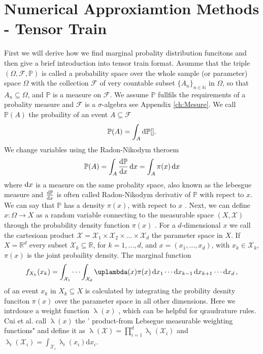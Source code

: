 \section{Numerical Approxiamtion Methods - Tensor Train}
\label{sec:tensortrain}
First we will derive how we find marginal probality distribution funcitons and then give a brief introduction into tensor train format.
Asumme that the triple $(\Omega, \mathcal{F} , \mathbb{P})$ is called a probability space over the whole sample (or parameter) space $\Omega$ with the collection $\mathcal{F}$ of very countable subset $\{ A _n \}_{n\in \mathbb{N}}$ in $\Omega$, so that $A_n \subseteq  \Omega$, and $\mathbb{P}$ is a measure on $\mathcal{F}$. 
We assume $\mathbb{P}$ fullfils the requirements of a probality measure and $\mathcal{F}$ is a $\sigma $-algebra see Appendix \ref{ch:Mesure}.
We call $\mathbb{P}(A)$ the probaility of an event $A \subseteq \mathcal{F}$ 
\begin{align}
	\mathbb{P}(A) = \int_A \mathop{}\!\mathrm{d} \mathbb{P} \text{\cite{}}.
\end{align}
We change variables using the Radon-Nikodym theroem \cite{kopp2004measintprob}
\begin{align}
	\mathbb{P}(A) = \int_{A}  \frac{\mathop{}\!\mathrm{d} \mathbb{P}}{\mathop{}\!\mathrm{d} x} \mathop{}\!\mathrm{d} x = \int_{A}  \pi(x) \mathop{}\!\mathrm{d} x
\end{align}
where $\mathop{}\!\mathrm{d} x$ is a measure on the same probality space, also known as the lebesgue measure and $\frac{\mathop{}\!\mathrm{d} \mathbb{P}}{\mathop{}\!\mathrm{d} x}$ is often called Radon-Nikodym derivativ of $\mathbb{P}$ with repect to $x$.
We can say that $\mathbb{P}$ has a density $ \pi(x)$, with repect to $x$ \cite[Chapter 10]{simonnet1996measprob}.
Next, we can define $x: \Omega \longrightarrow X$ as a random variable connecting to the measurable space $(X,\mathcal{X})$ through the probability density function $ \pi(x)$ \cite{kopp2004measintprob}.
For a $d$-dimensional $x$ we call the cartesioan product $\mathcal{X} = \mathcal{X}_1 \times \mathcal{X}_2 \times \dots \times \mathcal{X}_d$ the parameter space in $X$.
If $X = \mathbb{R}^d$ every subset $\mathcal{X}_k \subseteq \mathbb{R}$, for $k = 1, \dots , d$, and $x = (x_1 , \dots ,x_d)$, with $x_k \in \mathcal{X}_k$, $\pi(x)$ is the joint probaility density.
The marginal function
\begin{align}
	f_{X_k}(x_k) = \int_{\mathcal{X}_1} \cdots \int_{\mathcal{X}_d} \uplambda(x) \pi(x) \diff x_1 \cdots \diff x_{k-1} \diff x_{k+1} \cdots \diff x_d \, ,
\end{align}
of an event $x_k$ in $X_k \subseteq X$ is calculated by integrating the probility desnity funciton $\pi(x)$ over the parameter space in all other dimensions.
Here we intrdouce a weight function $\uplambda(x) $ \cite{davis2007methods}, which can be helpful for qraudrature rules.
Cui et al. \cite{cui2022deep} call $\uplambda(x)$ the ' product-from Lebsegue measurable weighting functions" and define it as $\uplambda( \mathcal{X}) = \prod_{i = 1}^{d}  \uplambda_i( \mathcal{X}_i) $ and  $\uplambda_i( \mathcal{X}_i) = \int_{ \mathcal{X}_i} \uplambda_i (x_i) \text{d}x_i$.

